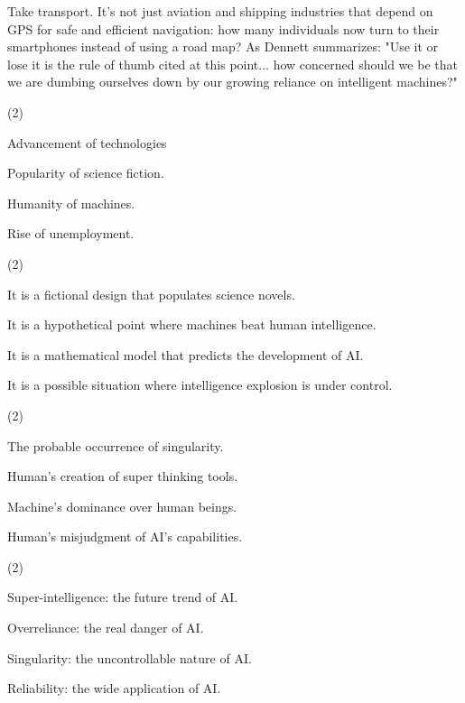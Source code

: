 \documentclass{英语试卷}
\begin{document}
\par Take transport. It's not just aviation and shipping industries that depend on GPS for safe and efficient navigation: how many individuals now turn to their smartphones instead of using a road map? As Dennett summarizes: "Use it or lose it is the rule of thumb cited at this point... how concerned should we be that we are dumbing ourselves down by our growing reliance on intelligent machines?"\par
{}
\begin{choices}(2)
  \item Advancement of technologies
  \item Popularity of science fiction.
  \item Humanity of machines.
  \item Rise of unemployment.
\end{choices}
\begin{choices}(2)
  \item It is a fictional design that populates science novels.
  \item It is a hypothetical point where machines beat human intelligence.
  \item It is a mathematical model that predicts the development of AI.
  \item It is a possible situation where intelligence explosion is under control.
\end{choices}
\begin{choices}(2)
  \item The probable occurrence of singularity.
  \item Human's creation of super thinking tools.
  \item Machine's dominance over human beings.
  \item Human's misjudgment of AI's capabilities.
\end{choices}
\begin{choices}(2)
  \item Super-intelligence: the future trend of AI.
  \item Overreliance: the real danger of AI.
  \item Singularity: the uncontrollable nature of AI.
  \item Reliability: the wide application of AI.
\end{choices}
\end{document}
